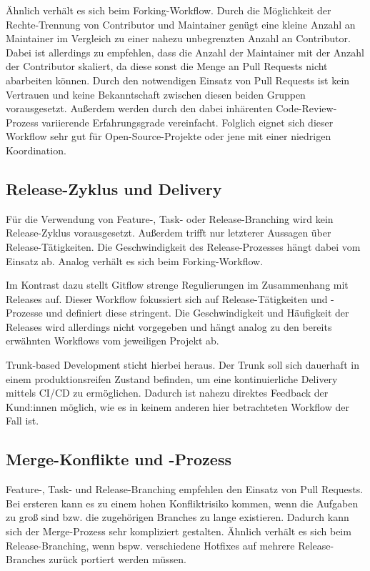 Ähnlich verhält es sich beim Forking\hyp Workflow. Durch die Möglichkeit der Rechte\hyp Trennung von Contributor und Maintainer genügt eine kleine Anzahl an Maintainer im Vergleich zu einer nahezu unbegrenzten Anzahl an Contributor. Dabei ist allerdings zu empfehlen, dass die Anzahl der Maintainer mit der Anzahl der Contributor skaliert, da diese sonst die Menge an Pull Requests nicht abarbeiten können. Durch den notwendigen Einsatz von Pull Requests ist kein Vertrauen und keine Bekanntschaft zwischen diesen beiden Gruppen vorausgesetzt. Außerdem werden durch den dabei inhärenten Code\hyp Review\hyp Prozess variierende Erfahrungsgrade vereinfacht. Folglich eignet sich dieser Workflow sehr gut für Open\hyp Source\hyp Projekte oder jene mit einer niedrigen Koordination.


\subsection{Release\hyp Zyklus und Delivery}

Für die Verwendung von Feature-, Task- oder Release\hyp Branching wird kein Release\hyp Zyklus vorausgesetzt. Außerdem trifft nur letzterer Aussagen über Release\hyp Tätigkeiten. Die Geschwindigkeit des Release\hyp Prozesses hängt dabei vom Einsatz ab. Analog verhält es sich beim Forking\hyp Workflow.

Im Kontrast dazu stellt Gitflow strenge Regulierungen im Zusammenhang mit Releases auf. Dieser Workflow fokussiert sich auf Release\hyp Tätigkeiten und -Prozesse und definiert diese stringent. Die Geschwindigkeit und Häufigkeit der Releases wird allerdings nicht vorgegeben und hängt analog zu den bereits erwähnten Workflows vom jeweiligen Projekt ab.

Trunk\hyp based Development sticht hierbei heraus. Der Trunk soll sich dauerhaft in einem produktionsreifen Zustand befinden, um eine kontinuierliche Delivery mittels CI/CD zu ermöglichen. Dadurch ist nahezu direktes Feedback der Kund:innen möglich, wie es in keinem anderen hier betrachteten Workflow der Fall ist.


\subsection{Merge\hyp Konflikte und -Prozess}

Feature-, Task- und Release\hyp Branching empfehlen den Einsatz von Pull Requests. Bei ersteren kann es zu einem hohen Konfliktrisiko kommen, wenn die Aufgaben zu groß sind bzw. die zugehörigen Branches zu lange existieren. Dadurch kann sich der Merge\hyp Prozess sehr kompliziert gestalten. Ähnlich verhält es sich beim Release\hyp Branching, wenn bspw. verschiedene Hotfixes auf mehrere Release\hyp Branches zurück portiert werden müssen.

